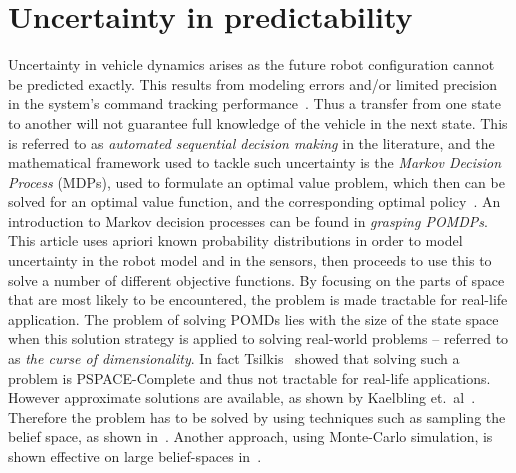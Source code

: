 \section{Uncertainty in predictability}
Uncertainty in vehicle dynamics arises as the future robot configuration cannot
be predicted exactly. This results from modeling errors and/or limited precision
in the system's command tracking
performance~\cite{dadkhahSurveyMotionPlanning2012}. Thus a transfer from one
state to another will not guarantee full knowledge of the vehicle in the next
state. This is referred to as \textit{automated sequential decision making} in
the literature, and the mathematical framework used to tackle such uncertainty
is the \textit{Markov Decision Process} (MDPs), used to formulate an optimal
value problem, which then can be solved for an optimal value function, and the
corresponding optimal policy~\cite{Cassandra:1998:EAA:926710}. An introduction
to Markov decision processes can be found in \textit{grasping
  POMDPs}\cite{kaelblingPlanningActingPartially1998}. This article uses apriori
known probability distributions in order to model uncertainty in the robot model
and in the sensors, then proceeds to use this to solve a number of different
objective functions. By focusing on the parts of space that are most likely to
be encountered, the problem is made tractable for real-life application. The
problem of solving POMDs lies with the size of the state space when this
solution strategy is applied to solving real-world problems -- referred to as
\textit{the curse of dimensionality}. In fact
Tsilkis~\cite{christosh.papadimitriouComplexityMarkovDecision1987} showed that
solving such a problem is PSPACE-Complete and thus not tractable for real-life
applications. However approximate solutions are available, as shown by Kaelbling
et.\ al~\cite{kaelblingPlanningActingPartially1998}. Therefore the problem has
to be solved by using techniques such as sampling the belief space, as shown
in~\cite{kearns2002sparse}. Another approach, using Monte-Carlo simulation, is
shown effective on large belief-spaces in~\cite{Veness_2011}.


